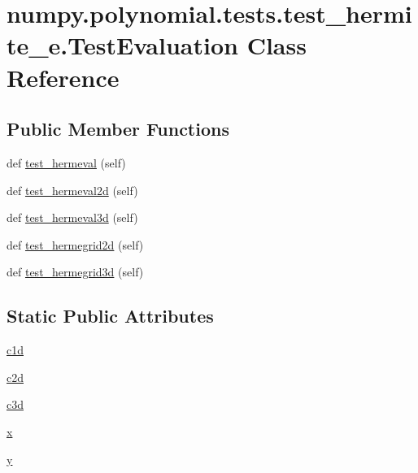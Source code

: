 \hypertarget{classnumpy_1_1polynomial_1_1tests_1_1test__hermite__e_1_1TestEvaluation}{}\section{numpy.\+polynomial.\+tests.\+test\+\_\+hermite\+\_\+e.\+Test\+Evaluation Class Reference}
\label{classnumpy_1_1polynomial_1_1tests_1_1test__hermite__e_1_1TestEvaluation}
\subsection*{Public Member Functions}
\begin{DoxyCompactItemize}
\item 
def \hyperlink{classnumpy_1_1polynomial_1_1tests_1_1test__hermite__e_1_1TestEvaluation_acf6edd060cd92c1ecf4ae90fa32f6041}{test\+\_\+hermeval} (self)
\item 
def \hyperlink{classnumpy_1_1polynomial_1_1tests_1_1test__hermite__e_1_1TestEvaluation_a3cd365085285e115dbb8b6560aa463ce}{test\+\_\+hermeval2d} (self)
\item 
def \hyperlink{classnumpy_1_1polynomial_1_1tests_1_1test__hermite__e_1_1TestEvaluation_a82ae43b6de837f4109f52e47c089869e}{test\+\_\+hermeval3d} (self)
\item 
def \hyperlink{classnumpy_1_1polynomial_1_1tests_1_1test__hermite__e_1_1TestEvaluation_a5860f994cf2ffe245e23ff33b3f7c79b}{test\+\_\+hermegrid2d} (self)
\item 
def \hyperlink{classnumpy_1_1polynomial_1_1tests_1_1test__hermite__e_1_1TestEvaluation_a00c89803e3d5f911b221900b8b21b70f}{test\+\_\+hermegrid3d} (self)
\end{DoxyCompactItemize}
\subsection*{Static Public Attributes}
\begin{DoxyCompactItemize}
\item 
\hyperlink{classnumpy_1_1polynomial_1_1tests_1_1test__hermite__e_1_1TestEvaluation_a95492307e5062f1bc46dc347abf76479}{c1d}
\item 
\hyperlink{classnumpy_1_1polynomial_1_1tests_1_1test__hermite__e_1_1TestEvaluation_ab7356f559f86dd970dbf9523e7bd1238}{c2d}
\item 
\hyperlink{classnumpy_1_1polynomial_1_1tests_1_1test__hermite__e_1_1TestEvaluation_ae4db8f86a433fb91996c7cc2312851c5}{c3d}
\item 
\hyperlink{classnumpy_1_1polynomial_1_1tests_1_1test__hermite__e_1_1TestEvaluation_aeda16b44fd23aa017eb8012e6eb23343}{x}
\item 
\hyperlink{classnumpy_1_1polynomial_1_1tests_1_1test__hermite__e_1_1TestEvaluation_a620f2a7c61dd1866354f79d8d74fc4c9}{y}
\end{DoxyCompactItemize}


